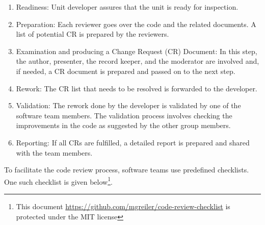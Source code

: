 \begin{enumerate}[nosep]
    \item Readiness: Unit developer assures that the unit is ready for inspection. 
    \item Preparation: Each reviewer goes over the code and the related documents. A list of potential CR is prepared by the reviewers.
    \item Examination and producing a Change Request (CR) Document: In this step, the author, presenter, the record keeper, and the moderator are involved and, if needed, a CR document is prepared and passed on to the next step.
    \item Rework: The CR list that needs to be resolved is forwarded to the developer.
    \item Validation: The rework done by the developer is validated by one of the software team members. The validation process involves checking the improvements in the code as suggested by the other group members. 
    \item Reporting:  If all CRs are fulfilled, a detailed report is prepared and shared with the team members.
\end{enumerate}

To facilitate the code review process, software teams use predefined checklists. One such checklist is given below\footnote{This document \url{https://github.com/mgreiler/code-review-checklist} is protected under the MIT license}. 

